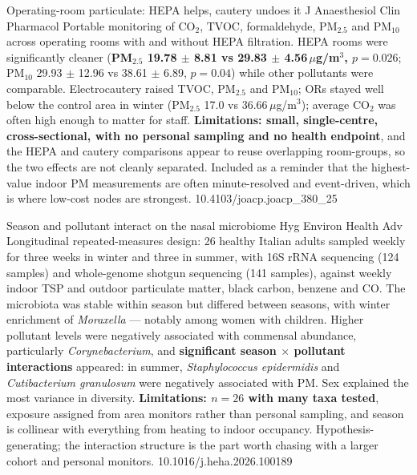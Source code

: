 \documentclass[10pt]{article}
\begin{document}
{Operating-room particulate: HEPA helps, cautery undoes it}
{J Anaesthesiol Clin Pharmacol}
{Portable monitoring of CO$_2$, TVOC, formaldehyde, PM$_{2.5}$ and PM$_{10}$ across
operating rooms with and without HEPA filtration. HEPA rooms were significantly cleaner
(\textbf{PM$_{2.5}$ 19.78 $\pm$ 8.81 vs 29.83 $\pm$ 4.56\,$\mu$g/m$^3$, $p = 0.026$};
PM$_{10}$ 29.93 $\pm$ 12.96 vs 38.61 $\pm$ 6.89, $p = 0.04$) while other pollutants were
comparable. Electrocautery raised TVOC, PM$_{2.5}$ and PM$_{10}$; ORs stayed well below
the control area in winter (PM$_{2.5}$ 17.0 vs 36.66\,$\mu$g/m$^3$); average CO$_2$ was
often high enough to matter for staff. \textbf{Limitations: small, single-centre,
cross-sectional, with no personal sampling and no health endpoint}, and the HEPA and
cautery comparisons appear to reuse overlapping room-groups, so the two effects are not
cleanly separated. Included as a reminder that the highest-value indoor PM measurements
are often minute-resolved and event-driven, which is where low-cost nodes are strongest.}
{10.4103/joacp.joacp_380_25}


{Season and pollutant interact on the nasal microbiome}
{Hyg Environ Health Adv}
{Longitudinal repeated-measures design: 26 healthy Italian adults sampled weekly for
three weeks in winter and three in summer, with 16S rRNA sequencing (124 samples) and
whole-genome shotgun sequencing (141 samples), against weekly indoor TSP and outdoor
particulate matter, black carbon, benzene and CO. The microbiota was stable within season
but differed between seasons, with winter enrichment of \textit{Moraxella} --- notably
among women with children. Higher pollutant levels were negatively associated with
commensal abundance, particularly \textit{Corynebacterium}, and
\textbf{significant season $\times$ pollutant interactions} appeared: in summer,
\textit{Staphylococcus epidermidis} and \textit{Cutibacterium granulosum} were negatively
associated with PM. Sex explained the most variance in diversity. \textbf{Limitations:
$n = 26$ with many taxa tested}, exposure assigned from area monitors rather than
personal sampling, and season is collinear with everything from heating to indoor
occupancy. Hypothesis-generating; the interaction structure is the part worth chasing
with a larger cohort and personal monitors.}
{10.1016/j.heha.2026.100189}
\end{document}
